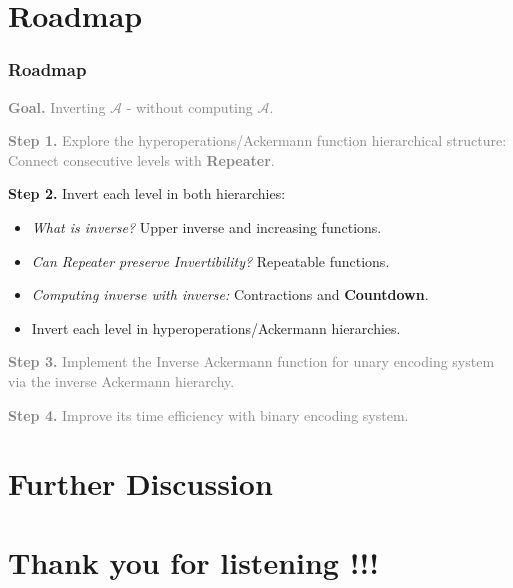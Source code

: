 \documentclass[10pt]{beamer}
\newcommand{\Ack}{\ensuremath{\mathcal{A}}}
\begin{document}
\section*{Roadmap}
\begin{frame}
\frametitle{Roadmap}
\textcolor<2>{gray}{\textbf{Goal.} Inverting $\Ack$ - without computing $\Ack$.} 

\bigskip

\textcolor<1->{gray}{\textbf{Step 1.} Explore the hyperoperations/Ackermann function hierarchical structure: Connect consecutive levels with \textbf{Repeater}.}

\bigskip

{ \textbf{Step 2.} Invert each level in both hierarchies:
	{ \small
		\begin{itemize}\itemsep0em
			\color<1-2>{gray}
			\item \emph{What is inverse?} Upper inverse and increasing functions.
			\item \emph{Can Repeater preserve Invertibility?} Repeatable functions.
			\item \emph{Computing inverse with inverse:} Contractions and \textbf{Countdown}.
			\item Invert each level in hyperoperations/Ackermann hierarchies.
		\end{itemize}
	}
}

\bigskip

\textcolor<1->{gray}{\textbf{Step 3.} Implement the Inverse Ackermann function for unary encoding system via the inverse Ackermann hierarchy.}

\bigskip

\textcolor<1->{gray}{\textbf{Step 4.} Improve its time efficiency with binary encoding system.}
\end{frame}

\section{Further Discussion}
\label{sec: discussion}


\section{Thank you for listening !!!}
%
%
\end{document}
